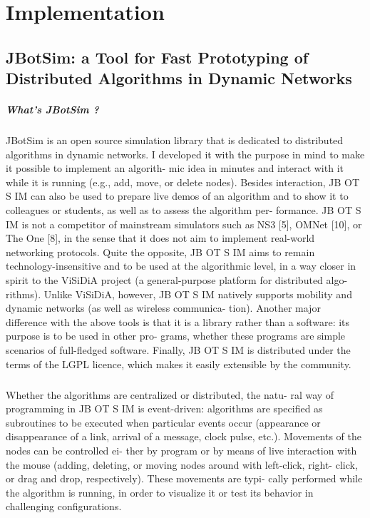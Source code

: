 \chapter{Implementation}
\section{JBotSim: a Tool for Fast Prototyping of Distributed Algorithms in Dynamic Networks}
\paragraph{What's JBotSim ?}JBotSim is an open source simulation library that is dedicated to distributed algorithms in dynamic networks. I developed it with the purpose in mind to make it possible to implement an algorith- mic idea in minutes and interact with it while it is running (e.g., add, move, or delete nodes). Besides interaction, JB OT S IM can also be used to prepare live demos of an algorithm and to show it to colleagues or students, as well as to assess the algorithm per- formance. JB OT S IM is not a competitor of mainstream simulators such as NS3 [5], OMNet [10], or The One [8], in the sense that it does not aim to implement real-world networking protocols. Quite the opposite, JB OT S IM aims to remain technology-insensitive and to be used at the algorithmic level, in a way closer in spirit to the ViSiDiA project (a general-purpose platform for distributed algo- rithms). Unlike ViSiDiA, however, JB OT S IM natively supports mobility and dynamic networks (as well as wireless communica- tion). Another major difference with the above tools is that it is a library rather than a software: its purpose is to be used in other pro- grams, whether these programs are simple scenarios of full-fledged software. Finally, JB OT S IM is distributed under the terms of the LGPL licence, which makes it easily extensible by the community.
\paragraph{}Whether the algorithms are centralized or distributed, the natu- ral way of programming in JB OT S IM is event-driven: algorithms are specified as subroutines to be executed when particular events occur (appearance or disappearance of a link, arrival of a message, clock pulse, etc.). Movements of the nodes can be controlled ei- ther by program or by means of live interaction with the mouse (adding, deleting, or moving nodes around with left-click, right- click, or drag and drop, respectively). These movements are typi- cally performed while the algorithm is running, in order to visualize it or test its behavior in challenging configurations.
